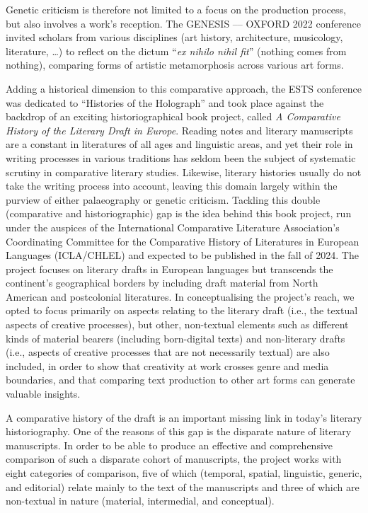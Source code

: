 \begin{preface}
Genetic criticism is therefore not limited to a focus on the production
process, but also involves a work's reception. The GENESIS –– OXFORD
2022 conference invited scholars from various disciplines (art history,
architecture, musicology, literature, \ldots) to reflect on the dictum
``\emph{ex nihilo nihil fit}'' (nothing comes from nothing), comparing forms of
artistic metamorphosis across various art forms.

Adding a historical dimension to this comparative approach, the ESTS
conference was dedicated to ``Histories of the Holograph'' and took place
against the backdrop of an exciting historiographical book project,
called \emph{A Comparative History of the Literary Draft in Europe}.
Reading notes and literary manuscripts are a constant in literatures of
all ages and linguistic areas, and yet their role in writing processes
in various traditions has seldom been the subject of systematic scrutiny
in comparative literary studies. Likewise, literary histories usually do
not take the writing process into account, leaving this domain largely
within the purview of either palaeography or genetic criticism. Tackling this double (comparative and historiographic) gap is the idea behind this book project, run under the
auspices of the International Comparative Literature Association's
Coordinating Committee for the Comparative History of Literatures in
European Languages (ICLA/CHLEL) and expected to be published in the fall of 2024.
The project focuses on literary drafts in European languages but
transcends the continent's geographical borders by including draft
material from North American and postcolonial literatures. In
conceptualising the project's reach, we opted to focus primarily on
aspects relating to the literary draft (i.e., the textual aspects of
creative processes), but other, non-textual elements such as different
kinds of material bearers (including born-digital texts) and
non-literary drafts (i.e., aspects of creative processes that are not
necessarily textual) are also included, in order to show that creativity
at work crosses genre and media boundaries, and that comparing text
production to other art forms can generate valuable insights.

A comparative history of the draft is an important missing link in
today's literary historiography. One of the reasons of this gap is the
disparate nature of literary manuscripts. In order to be able to produce
an effective and comprehensive comparison of such a disparate cohort of
manuscripts, the project works with eight categories of comparison,
five of which (temporal, spatial, linguistic, generic, and editorial)
relate mainly to the text of the manuscripts and three of which are
non-textual in nature (material, intermedial, and conceptual).


\end{preface}
